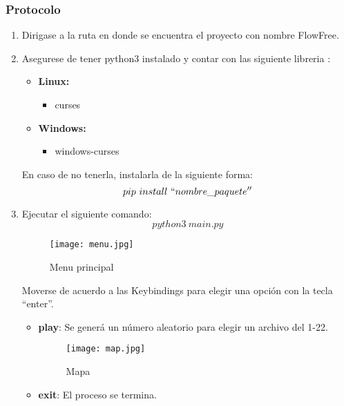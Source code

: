 \documentclass[letter]{article}
\begin{document}
\subsubsection{Protocolo}
\begin{enumerate}
	\item Dirigase a la ruta en donde se encuentra el proyecto con nombre FlowFree.
	\item Asegurese de tener python3 instalado y contar con las siguiente libreria :
	      \begin{itemize}
		      \item \textbf{Linux:}
		            \begin{itemize}
			            \item curses
		            \end{itemize}
		      \item \textbf{Windows:}
		            \begin{itemize}
			            \item windows-curses
		            \end{itemize}
	      \end{itemize}
	      En caso de no tenerla, instalarla de la siguiente forma: $$
		      pip ~ install ~  ``nombre\_paquete''$$
	\item Ejecutar el siguiente comando: $$ python3 ~ main.py$$
	      \begin{figure}[H]
		      \centerline{\texttt{[image: menu.jpg]}}
		      \caption{Menu principal}
		      \label{fig}
	      \end{figure}
	      Moverse de acuerdo a las Keybindings para elegir una opci\'on con la tecla ``enter''.
	      \begin{itemize}
		      \item \textbf{play}: Se gener\'a un n\'umero aleatorio para elegir un archivo del 1-22.
		            \begin{figure}[H]
			            \centerline{\texttt{[image: map.jpg]}}
			            \caption{Mapa}
			            \label{fig}
		            \end{figure}
		      \item \textbf{exit}: El proceso se termina.
	      \end{itemize}


\end{enumerate}
\end{document}
